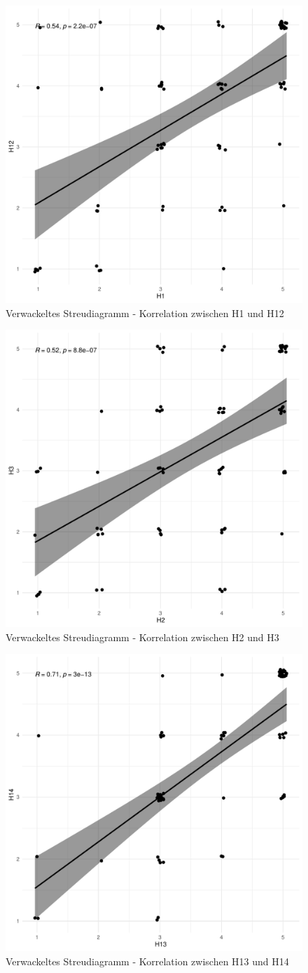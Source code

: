 \begin{figure}[H]
\centering
\includegraphics[width=0.65\columnwidth]{figures/plots/h1_h12.pdf}
\caption{\label{fig:h1-h12} Verwackeltes Streudiagramm - Korrelation zwischen H1 und H12}
\end{figure}

\begin{figure}[H]
\centering
\includegraphics[width=0.65\columnwidth]{figures/plots/h2_h3.pdf}
\caption{\label{fig:h2-h3} Verwackeltes Streudiagramm - Korrelation zwischen H2 und H3}
\end{figure}


\begin{figure}[H]
\centering
\includegraphics[width=0.65\columnwidth]{figures/plots/h13_h14.pdf}
\caption{\label{fig:h13-h14} Verwackeltes Streudiagramm - Korrelation zwischen H13 und H14}
\end{figure}